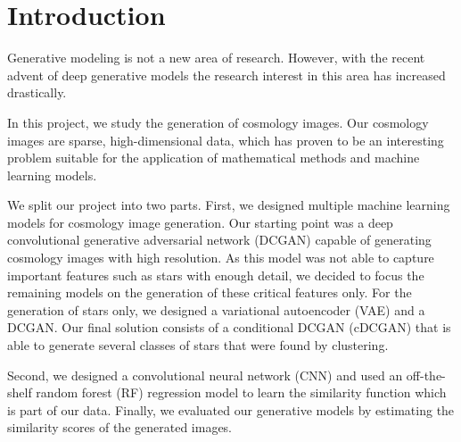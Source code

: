 \documentclass[10pt,conference,compsocconf]{IEEEtran}
\newcommand\TODO[1]{\textcolor{red}{#1}} %
\begin{document}
\section{Introduction}
\label{sec:introduction}
Generative modeling is not a new area of research. However, with the recent advent of deep generative models the research interest in this area has increased drastically. 

In this project, we study the generation of cosmology images. Our cosmology images are sparse, high-dimensional data, which has proven to be an interesting problem suitable for the application of mathematical methods and machine learning models.

We split our project into two parts. First, we designed multiple machine learning models for cosmology image generation. Our starting point was a deep convolutional generative adversarial network (DCGAN) capable of generating cosmology images with high resolution. As this model was not able to capture important features such as stars with enough detail, we decided to focus the remaining models on the generation of these critical features only. For the generation of stars only, we designed a variational autoencoder (VAE) and a DCGAN. 
Our final solution consists of a conditional DCGAN (cDCGAN) that is able to generate several classes of stars that were found by clustering.

Second, we designed a convolutional neural network (CNN) and used an off-the-shelf random forest (RF) regression model to learn the similarity function which is part of our data. Finally, we evaluated our generative models by estimating the similarity scores of the generated images. 



\end{document}
